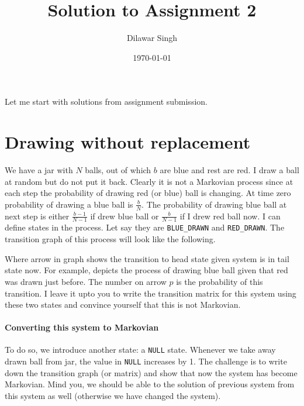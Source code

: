 \documentclass[a4paper,10pt]{article}
\title{Solution to Assignment 2}
\author{Dilawar Singh}
\date{\today}
\begin{document}
\maketitle

Let me start with solutions from assignment submission. 

\section{Drawing without replacement} 

We have a jar with $N$ balls, out of which $b$ are blue and rest are red. I draw
a ball at random but do not put it back.  Clearly it is not a Markovian process
since at each step the probability of drawing red (or blue) ball is changing. At
time zero probability of drawing a blue ball is $\frac{b}{N}$. The probability
of drawing blue ball at next step is either $\frac{b-1}{N-1}$ if drew blue ball
or $\frac{b}{N-1}$ if I drew red ball now. I can define states in the process.
Let say they are {\tt BLUE\_DRAWN} and {\tt RED\_DRAWN}. The transition graph of
this process will look like the following.


Where arrow in graph shows the transition to head state given system is in tail
state now. For example,  depicts the process of drawing blue ball given that red was drawn
just before. The number on arrow $p$ is the probability of this transition. I
leave it upto you to write the transition matrix for this system using these two
states and convince yourself that this is not Markovian.

\paragraph{Converting {\bf this} system to Markovian}  To do so, we introduce
another state: a {\tt NULL} state. Whenever we take away drawn ball from jar,
the value in {\tt NULL} increases by 1. The challenge is to write down the
transition graph (or matrix) and show that now the system has become Markovian.
Mind you, we should be able to the solution of previous system from this system
as well (otherwise we have changed the system).
\end{document}
